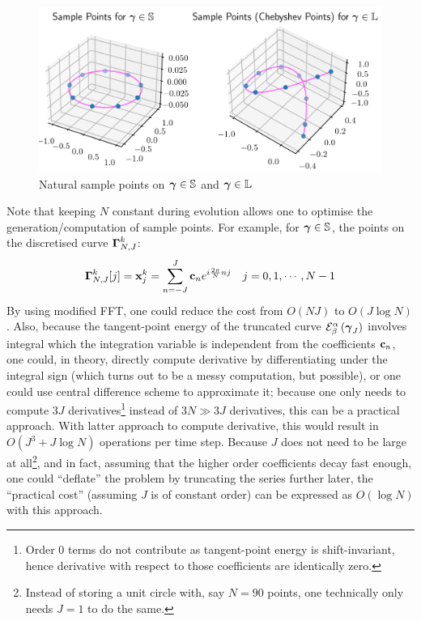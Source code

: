 \documentclass[../dissertation.tex]{subfiles}
\begin{document}
\begin{figure}[tbp]
    \centering
    \includegraphics[width=\textwidth]{sections/FourierSeriesImgs/SamplePointsOnCurves}
    \caption{Natural sample points on $\boldsymbol{\gamma} \in \mathbb{S}$ and $\boldsymbol{\gamma} \in \mathbb{L}$}
\end{figure}

Note that keeping $N$ constant during evolution allows one to optimise the generation/computation of sample points.
For example, for $\boldsymbol{\gamma} \in \mathbb{S}$, the points on the discretised curve $\boldsymbol{\Gamma}_{N,J}^k$:
\begin{align}
    \boldsymbol{\Gamma}_{N,J}^k [j] &= \mathbf{x}_{j}^{k} = \sum_{n=-J}^{J} \mathbf{c}_{n} e^{i \frac{2\pi}{N}n j} & j=0,1,\cdots,N-1
    \label{equ: DFT}
\end{align}
By using modified FFT\cite{5213896}, one could reduce the cost from $O\left( NJ \right)$ to $O \left( J \log N \right)$.
Also, because the tangent-point energy of the truncated curve $\mathcal{E}_{\beta}^{\alpha} \left( \boldsymbol{\gamma}_{J} \right)$ involves integral which the integration variable is independent from the coefficients $\mathbf{c}_n$,
one could, in theory, directly compute derivative by differentiating under the integral sign (which turns out to be a messy computation, but possible),
or one could use central difference scheme to approximate it;
because one only needs to compute $3J$ derivatives\footnote{Order $0$ terms do not contribute as tangent-point energy is shift-invariant, hence derivative with respect to those coefficients are identically zero.}
instead of $3N \gg 3J$ derivatives, this can be a practical approach.
With latter approach to compute derivative, this would result in $O\left( J^3 + J \log N \right)$ operations per time step.
Because $J$ does not need to be large at all\footnote{Instead of storing a unit circle with, say $N = 90$ points, one technically only needs $J=1$ to do the same.},
and in fact, assuming that the higher order coefficients decay fast enough,
one could ``deflate'' the problem by truncating the series further later,
the ``practical cost'' (assuming $J$ is of constant order) can be expressed as $O\left( \log N \right)$ with this approach.
\end{document}
